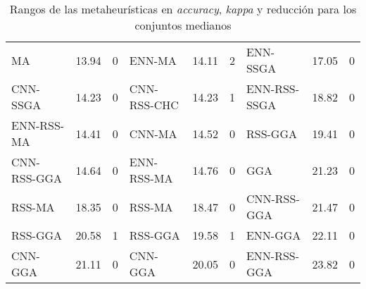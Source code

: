 \begin{table}[]
\begin{adjustbox}{max width =\textwidth}
\begin{tabular}{l c c|l c c|l c c}
MA           & 13.94 & 0 & ENN-MA       & 14.11 & 2 & ENN-SSGA     & 17.05 & 0 \\
CNN-SSGA     & 14.23 & 0 & CNN-RSS-CHC  & 14.23 & 1 & ENN-RSS-SSGA & 18.82 & 0 \\
ENN-RSS-MA   & 14.41 & 0 & CNN-MA       & 14.52 & 0 & RSS-GGA      & 19.41 & 0 \\
CNN-RSS-GGA  & 14.64 & 0 & ENN-RSS-MA   & 14.76 & 0 & GGA          & 21.23 & 0 \\
RSS-MA       & 18.35 & 0 & RSS-MA       & 18.47 & 0 & CNN-RSS-GGA  & 21.47 & 0 \\
RSS-GGA      & 20.58 & 1 & RSS-GGA      & 19.58 & 1 & ENN-GGA      & 22.11 & 0 \\
CNN-GGA      & 21.11 & 0 & CNN-GGA      & 20.05 & 0 & ENN-RSS-GGA  & 23.82 & 0 \\


\hline
\end{tabular}
\end{adjustbox}
\caption{Rangos de las metaheurísticas en \emph{accuracy}, \emph{kappa} y reducción para los conjuntos medianos}
\label{rank1-med}
\end{table} 

